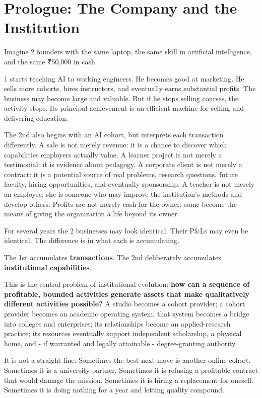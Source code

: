 
\section*{Prologue: The Company and the Institution}

Imagine 2 founders with the same laptop, the same skill in artificial intelligence, and the same \textnormal{₹}50,000 in cash.

1 starts teaching AI to working engineers. He becomes good at marketing. He sells more cohorts, hires instructors, and eventually earns substantial profits. The business may become large and valuable. But if he stops selling courses, the activity stops. Its principal achievement is an efficient machine for selling and delivering education.

The 2nd also begins with an AI cohort, but interprets each transaction differently. A sale is not merely revenue: it is a chance to discover which capabilities employers actually value. A learner project is not merely a testimonial: it is evidence about pedagogy. A corporate client is not merely a contract: it is a potential source of real problems, research questions, future faculty, hiring opportunities, and eventually sponsorship. A teacher is not merely an employee: she is someone who may improve the institution's methods and develop others. Profits are not merely cash for the owner: some become the means of giving the organization a life beyond its owner.

For several years the 2 businesses may look identical. Their P\&Ls may even be identical. The difference is in what each is accumulating.

The 1st accumulates \textbf{transactions}. The 2nd deliberately accumulates \textbf{institutional capabilities}.

This is the central problem of institutional evolution: \textbf{how can a sequence of profitable, bounded activities generate assets that make qualitatively different activities possible?} A studio becomes a cohort provider; a cohort provider becomes an academic operating system; that system becomes a bridge into colleges and enterprises; its relationships become an applied-research practice; its resources eventually support independent scholarship, a physical home, and - if warranted and legally attainable - degree-granting authority.

It is not a straight line. Sometimes the best next move is another online cohort. Sometimes it is a university partner. Sometimes it is refusing a profitable contract that would damage the mission. Sometimes it is hiring a replacement for oneself. Sometimes it is doing nothing for a year and letting quality compound.

